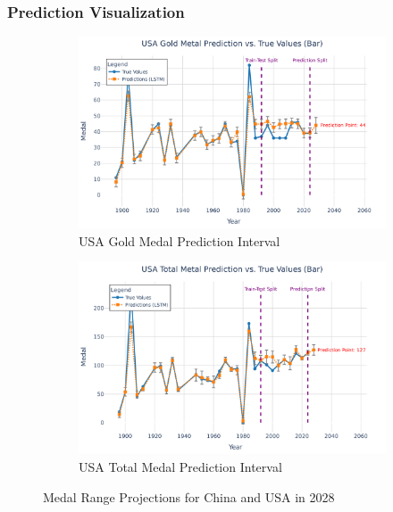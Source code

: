 \documentclass{mcmthesis}
\begin{document}
\subsubsection{Prediction Visualization}

\begin{figure}[H]
	\centering
	\begin{subfigure}[b]{0.48\textwidth}
		\includegraphics[width=\textwidth]{fig/USA Gold Metal Prediction vs. True Values (Bar).png}
		\caption{USA Gold Medal Prediction Interval}
		\label{fig:usa_gold}
	\end{subfigure}
	\hfill
	\begin{subfigure}[b]{0.48\textwidth}
		\includegraphics[width=\textwidth]{fig/USA Total Metal Prediction vs. True Values (Bar).png}
		\caption{USA Total Medal Prediction Interval}
		\label{fig:usa_total}
	\end{subfigure}
	\caption{Medal Range Projections for China and USA in 2028}

\end{figure}
\end{document}
